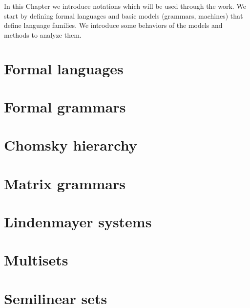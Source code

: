 In this Chapter we introduce notations which will be used through the work. We start by defining formal languages and basic models (grammars, machines) that define language families. We introduce some behaviors of the models and methods to analyze them.

\section{Formal languages} %
\label{sec:formal_languages}



\section{Formal grammars} %
\label{sec:formal_grammars}



\section{Chomsky hierarchy} %
\label{sec:chomsky_hierarchy}



\section{Matrix grammars} %
\label{sec:matrix_grammars}



\section{Lindenmayer systems} %
\label{sec:lindenmayer_systems}



\section{Multisets} %
\label{sec:multisets}



\section{Semilinear sets} %
\label{sec:semilinear_sets}


